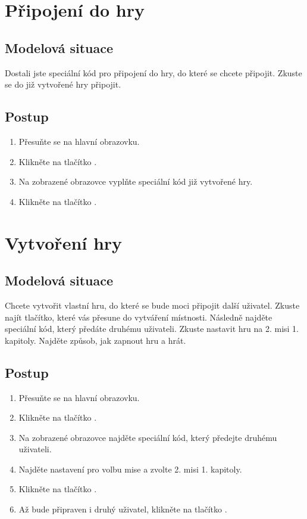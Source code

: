 \section{Připojení do hry}

\subsection*{Modelová situace}

Dostali jste speciální kód pro připojení do hry,
do které se chcete připojit.
Zkuste se do již vytvořené hry připojit.

\subsection*{Postup}

\begin{enumerate}
    \item Přesuňte se na hlavní obrazovku.
    \item Klikněte na tlačítko .
    \item Na zobrazené obrazovce vyplňte speciální kód již vytvořené hry.
    \item Klikněte na tlačítko .
\end{enumerate}

\section{Vytvoření hry}

\subsection*{Modelová situace}

Chcete vytvořit vlastní hru,
do které se bude moci připojit další uživatel.
Zkuste najít tlačítko,
které vás přesune do vytváření místnosti.
Následně najděte speciální kód,
který předáte druhému uživateli.
Zkuste nastavit hru na 2. misi 1. kapitoly.
Najděte způsob, jak zapnout hru a hrát.

\subsection*{Postup}

\begin{enumerate}
    \item Přesuňte se na hlavní obrazovku.
    \item Klikněte na tlačítko .
    \item Na zobrazené obrazovce najděte speciální kód,
    který předejte druhému uživateli.
    \item Najděte nastavení pro volbu mise a zvolte 2. misi 1. kapitoly.
    \item Klikněte na tlačítko .
    \item Až bude připraven i druhý uživatel,
    klikněte na tlačítko .
\end{enumerate}

